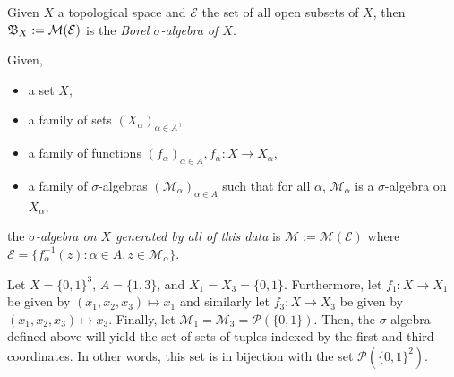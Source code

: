 \documentclass[11pt,leqno,oneside]{amsbook}
\numberwithin{thm}{section}
\renewcommand{\P}{\mathcal{P}}
\newcommand{\M}{\mathcal{M}}
\newcommand{\Ep}{\mathcal{E}}
\begin{document}
\begin{defn}
  Given $X$ a topological space and $\Ep$ the set of all open subsets of $X$,
  then $\B_X := \M(\Ep)$ is the \emph{Borel $\sigma$-algebra of $X$}.
\end{defn}
\begin{defn}\label{gen-sigma-alg-product}
  Given,
  \begin{itemize}
  \item a set $X$,
  \item a family of sets $(X_\alpha)_{\alpha \in A}$,
  \item a family of functions $(f_\alpha)_{\alpha \in A}, f_\alpha: X
    \to X_\alpha$,
  \item a family of $\sigma$-algebras $(\M_\alpha)_{\alpha \in A}$ such
    that for all $\alpha$, $\M_\alpha$ is a $\sigma$-algebra on
    $X_\alpha$,
  \end{itemize}
  the \emph{$\sigma$-algebra on $X$ generated by all of this data} is
  $\M := \M(\Ep)$ where $\Ep = \{f_\alpha^{-1}(z) : \alpha \in A, z \in
  \M_\alpha\}$.
\end{defn}
\begin{example}
  Let $X = \{0,1\}^3$, $A = \{1,3\}$, and $X_1 = X_3 =
  \{0,1\}$. Furthermore, let $f_1\colon  X \to X_1$ be given by
  $(x_1,x_2,x_3) \mapsto x_1$ and similarly let $f_3\colon  X \to X_3$ be given by $(x_1,x_2,x_3) \mapsto x_3$. Finally, let
  $\M_1 = \M_3 = \P(\{0,1\})$. Then, the $\sigma$-algebra defined
  above will yield the set of sets of tuples indexed by the first and
  third coordinates. In other words, this set is in bijection with the
  set $\P(\{0,1\}^2)$.
\end{example}
\end{document}
